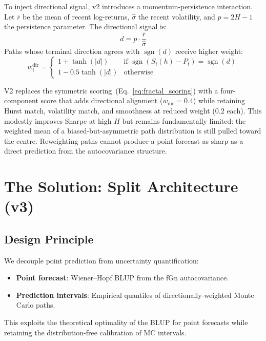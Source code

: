 \documentclass[12pt,a4paper]{article}
\begin{document}
To inject directional signal, v2 introduces a momentum-persistence
interaction.  Let $\bar{r}$ be the mean of recent log-returns, $\hat{\sigma}$
the recent volatility, and $p = 2H - 1$ the persistence parameter.  The
directional signal is:
\begin{equation}
  d = p \cdot \frac{\bar{r}}{\hat{\sigma}}
  \label{eq:v2_signal}
\end{equation}
Paths whose terminal direction agrees with $\operatorname{sgn}(d)$ receive
higher weight:
\begin{equation}
  w_i^{\text{dir}} = \begin{cases}
    1 + \tanh(|d|) & \text{if } \operatorname{sgn}(S_i(h) - P_t) =
                      \operatorname{sgn}(d) \\
    1 - 0.5\tanh(|d|) & \text{otherwise}
  \end{cases}
  \label{eq:v2_weights}
\end{equation}

V2 replaces the symmetric scoring~(Eq.~\ref{eq:fractal_scoring}) with a
four-component score that adds directional alignment ($w_{\text{dir}} = 0.4$)
while retaining Hurst match, volatility match, and smoothness at reduced
weight ($0.2$ each).  This modestly improves Sharpe at high $H$ but remains
fundamentally limited: the weighted mean of a biased-but-asymmetric path
distribution is still pulled toward the centre.  Reweighting paths cannot
produce a point forecast as sharp as a direct prediction from the
autocovariance structure.

\section{The Solution: Split Architecture (v3)}
\label{sec:solution}

\subsection{Design Principle}

We decouple point prediction from uncertainty quantification:
\begin{itemize}
  \item \textbf{Point forecast}: Wiener--Hopf BLUP from the fGn
        autocovariance.
  \item \textbf{Prediction intervals}: Empirical quantiles of
        directionally-weighted Monte Carlo paths.
\end{itemize}
This exploits the theoretical optimality of the BLUP for point forecasts
while retaining the distribution-free calibration of MC intervals.
\end{document}
